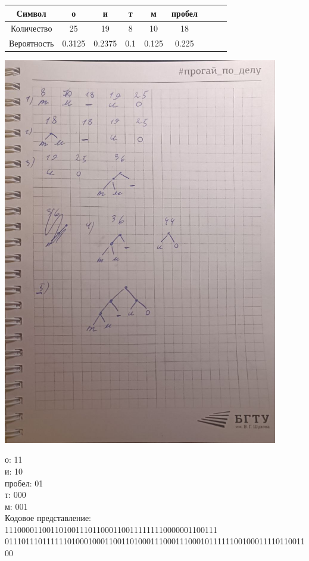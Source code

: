 \documentclass[a4paper,14pt]{extarticle}
\begin{document}
\begin{center}
    \begin{tabular}{|c|c|c|c|c|c|c|c|c|}
        \hline
        Символ      & о      & и      & т   & м     & пробел \\
        \hline
        Количество  & 25     & 19     & 8   & 10    & 18     \\
        \hline
        Вероятность & 0.3125 & 0.2375 & 0.1 & 0.125 & 0.225  \\
        \hline
    \end{tabular}
    \includegraphics[width=120mm]{task3.jpg}\\
\end{center}
о: 11\\
и: 10\\
пробел: 01\\
т: 000\\
м: 001\\
Кодовое представление: 111000011001101001110110001100111111110000001100111\\
01110111011111101000100011001101000111000111000101111110010001111011001100\\
\end{document}
